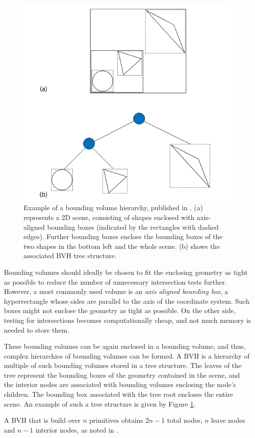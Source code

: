\begin{figure}
	\centering
	\includegraphics[width=.7\linewidth]{img/1 fundamentals/bvh.png}
	\caption{Example of a bounding volume hierarchy, published in \cite{pharr2016physically}. (a) represents a 2D scene, consisting of shapes enclosed with axis-aligned bounding boxes (indicated by the rectangles with dashed edges). Further bounding boxes enclose the bounding boxes of the two shapes in the bottom left and the whole scene. (b) shows the associated BVH tree structure.}
	\label{fig:bvh}
\end{figure}

Bounding volumes should ideally be chosen to fit the enclosing geometry as tight as possible to reduce the number of unnecessary intersection tests further. However, a most commonly used volume is an \emph{axis aligned bounding box}, a hyperrectangle whose sides are parallel to the axis of the coordinate system. Such boxes might not enclose the geometry as tight as possible. On the other side, testing for intersections becomes computationally cheap, and not much memory is needed to store them.

These bounding volumes can be again enclosed in a bounding volume, and thus, complex hierarchies of bounding volumes can be formed.
A BVH is a hierarchy of multiple of such bounding volumes stored in a tree structure. The leaves of the tree represent the bounding boxes of the geometry contained in the scene, and the interior nodes are associated with bounding volumes enclosing the node's children. The bounding box associated with the tree root encloses the entire scene. An example of such a tree structure is given by Figure \ref{fig:bvh}.

A BVH that is build over $n$ primitives obtains $2n-1$ total nodes, $n$ leave nodes and $n-1$ interior nodes, as noted in \cite{pharr2016physically}.

